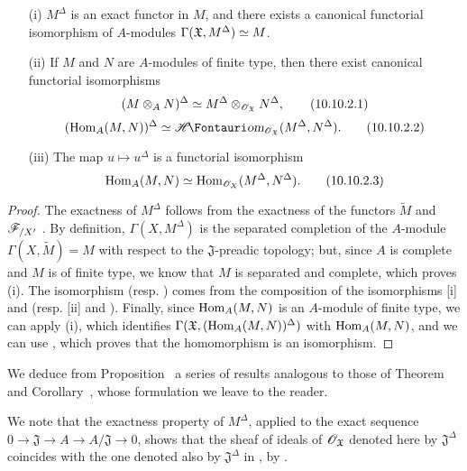 \begin{proposition}[10.10.2]
\label{I.10.10.2}
\medskip\noindent
\begin{enumerate}
  \item[\rm{(i)}] $M^\Delta$ is an exact functor in $M$, and there exists a canonical functorial isomorphism of $A$-modules $\Gamma(\mathfrak{X},M^\Delta)\simeq M$.
  \item[\rm{(ii)}] If $M$ and $N$ are $A$-modules of finite type, then there exist canonical functorial isomorphisms
    \[
    \label{I.10.10.2.1}
      (M\otimes_A N)^\Delta\simeq M^\Delta\otimes_{\mathscr{O}_\mathfrak{X}}N^\Delta,
      \tag{10.10.2.1}
    \]
    \[
    \label{I.10.10.2.2}
      (\Hom_A(M,N))^\Delta\isoto\shHom_{\sh{O}_\mathfrak{X}}(M^\Delta,N^\Delta).
      \tag{10.10.2.2}
    \]
  \item[\rm{(iii)}] The map $u\mapsto u^\Delta$ is a functorial isomorphism
    \[
    \label{I.10.10.2.3}
      \operatorname{Hom}_A(M,N)\simeq\operatorname{Hom}_{\mathscr{O}_X}(M^\Delta,N^\Delta).
      \tag{10.10.2.3}
    \]
\end{enumerate}
\end{proposition}

\begin{proof}
The exactness of $M^\Delta$ follows from the exactness of the functors $\widetilde{M}$  and $\mathscr{F}_{/X'}$ .
By definition, $\Gamma(X,M^\Delta)$ is the separated completion of the $A$-module $\Gamma(X,\widetilde{M})=M$ with respect to the $\mathfrak{J}$-preadic topology; but, since $A$ is complete and $M$ is of finite type, we know  that $M$ is separated and complete, which proves (i).
The isomorphism  (resp. ) comes from the composition of the isomorphisms [i] and  (resp. [ii] and ).
Finally, since $\operatorname{Hom}_A(M,N)$ is an $A$-module of finite type, we can apply (i), which identifies $\Gamma(\mathfrak{X},(\operatorname{Hom}_A(M,N))^\Delta)$ with $\operatorname{Hom}_A(M,N)$, and we can use , which proves that the homomorphism  is an isomorphism.
\end{proof}

We deduce from Proposition~ a series of results analogous to those of Theorem~ and Corollary~, whose formulation we leave to the reader.

We note that the exactness property of $M^\Delta$, applied to the exact sequence $0\to\mathfrak{J}\to A\to A/\mathfrak{J}\to 0$, shows that the sheaf of ideals of $\mathscr{O}_\mathfrak{X}$ denoted here by $\mathfrak{J}^\Delta$ coincides with the one denoted also by $\mathfrak{J}^\Delta$ in , by .

